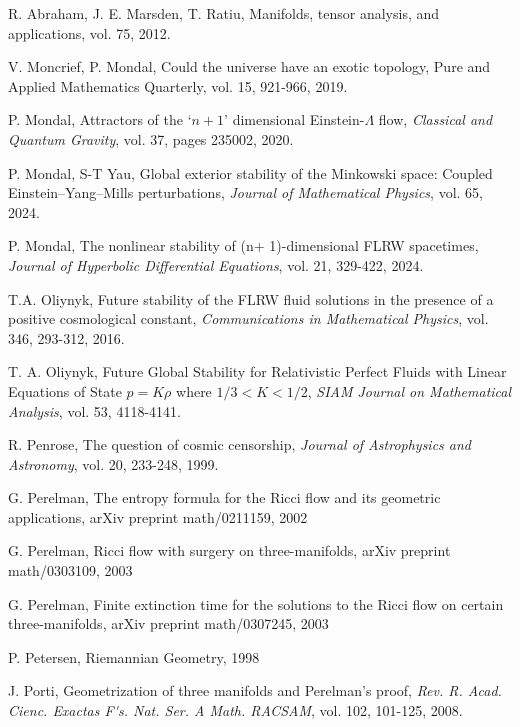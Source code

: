 \documentclass{amsart}
\def\i {\infty}
\begin{document}
\begin{thebibliography}{}
 R. Abraham, J. E. Marsden, T. Ratiu, Manifolds, tensor analysis, and applications, vol. 75, 2012.  

 V. Moncrief, P. Mondal, Could the universe have an exotic topology, Pure and Applied Mathematics Quarterly, vol. 15, 921-966, 2019.

 P. Mondal, Attractors of the `$n+1$' dimensional Einstein-$\Lambda$ flow, \textit{Classical and Quantum Gravity}, vol. 37, pages 235002, 2020. 

 P. Mondal, S-T Yau, Global exterior stability of the Minkowski space: Coupled Einstein--Yang--Mills perturbations, \textit{Journal of Mathematical Physics}, vol. 65, 2024.  

 P. Mondal, The nonlinear stability of (n+ 1)-dimensional FLRW spacetimes, \textit{Journal of Hyperbolic Differential Equations}, vol. 21, 329-422, 2024.  

 T.A. Oliynyk, Future stability of the FLRW fluid solutions in the presence of a positive cosmological constant, \textit{Communications in Mathematical Physics}, vol. 346, 293-312, 2016.  

 T. A. Oliynyk, Future Global Stability for Relativistic Perfect Fluids with Linear Equations of State $p=K\rho$ where $1/3<K<1/2$, \textit{SIAM Journal on Mathematical Analysis}, vol. 53, 4118-4141.  

 R. Penrose, The question of cosmic censorship, \textit{Journal of Astrophysics and Astronomy}, vol. 20, 233-248, 1999.  




 G. Perelman, The entropy formula for the Ricci flow and its geometric applications, arXiv preprint math/0211159, 2002   


 G. Perelman, Ricci flow with surgery on three-manifolds, arXiv preprint math/0303109, 2003   

 G. Perelman, Finite extinction time for the solutions to the Ricci flow on certain three-manifolds, arXiv preprint math/0307245, 2003 

 P. Petersen, Riemannian Geometry, 1998

 J. Porti, Geometrization of three manifolds and Perelman’s proof, \textit{Rev. R. Acad. Cienc. Exactas F{\'\i}s. Nat. Ser. A Math. RACSAM}, vol. 102, 101-125, 2008.  


\end{thebibliography}
\end{document}
